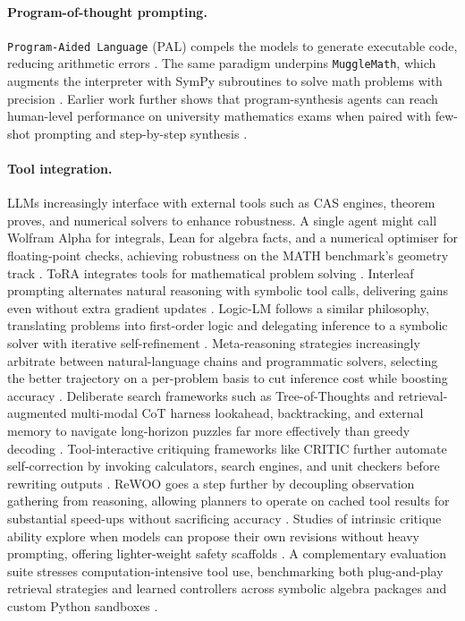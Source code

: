 \documentclass[acmsmall,anonymous]{acmart}
\begin{document}
\paragraph{Program-of-thought prompting.}
\texttt{Program-Aided Language} (PAL) compels the models to generate executable code, reducing arithmetic errors \cite{chen2022program,gao2022pal}.  The same paradigm underpins \texttt{MuggleMath}, which augments the interpreter with SymPy subroutines to solve math problems with precision \cite{li2024mugglemath}.
Earlier work further shows that program-synthesis agents can reach human-level performance on university mathematics exams when paired with few-shot prompting and step-by-step synthesis \cite{drori-2022-program-synthesis}.

\paragraph{Tool integration.}
LLMs increasingly interface with external tools such as CAS engines, theorem proves, and numerical solvers to enhance robustness.  A single agent might call Wolfram Alpha for integrals, Lean for algebra facts, and a numerical optimiser for floating-point checks, achieving robustness on the MATH benchmark’s geometry track \cite{frieder2023mathematical}. ToRA integrates tools for mathematical problem solving \cite{gou2023}.  Interleaf prompting alternates natural reasoning with symbolic tool calls, delivering gains even without extra gradient updates \cite{chen-2023-interleaf}.  Logic-LM follows a similar philosophy, translating problems into first-order logic and delegating inference to a symbolic solver with iterative self-refinement \cite{pan-2023-logiclm}.  Meta-reasoning strategies increasingly arbitrate between natural-language chains and programmatic solvers, selecting the better trajectory on a per-problem basis to cut inference cost while boosting accuracy \cite{zhao-2023-auto-model-selection}.  Deliberate search frameworks such as Tree-of-Thoughts and retrieval-augmented multi-modal CoT harness lookahead, backtracking, and external memory to navigate long-horizon puzzles far more effectively than greedy decoding \cite{yao-2023-tree-of-thoughts,liu-2024-ramcot}.  Tool-interactive critiquing frameworks like CRITIC further automate self-correction by invoking calculators, search engines, and unit checkers before rewriting outputs \cite{gou2024criticlargelanguagemodels}.  ReWOO goes a step further by decoupling observation gathering from reasoning, allowing planners to operate on cached tool results for substantial speed-ups without sacrificing accuracy \cite{xu2023rewoodecouplingreasoningobservations}.  Studies of intrinsic critique ability explore when models can propose their own revisions without heavy prompting, offering lighter-weight safety scaffolds \cite{luo2023critiqueabilitylargelanguage}.  A complementary evaluation suite stresses computation-intensive tool use, benchmarking both plug-and-play retrieval strategies and learned controllers across symbolic algebra packages and custom Python sandboxes \cite{zhang-2023-tool-aug}.
\end{document}
